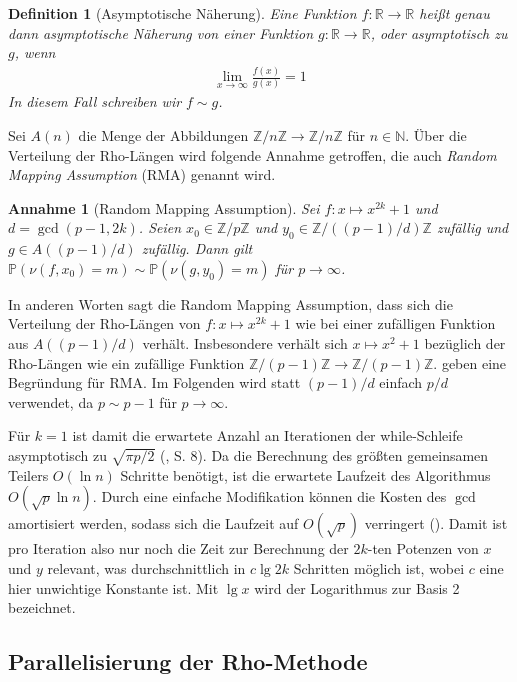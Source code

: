 \documentclass[a4paper, 10pt, ngerman]{article}
\newcommand{\N}{\mathbb{N}}
\newcommand{\R}{\mathbb{R}}
\newcommand{\Z}{\mathbb{Z}}
\renewcommand{\P}{\mathbb{P}}
\newtheorem{definition}{Definition}
\newtheorem*{assumption*}{Annahme}
\begin{document}
\begin{definition}[Asymptotische Näherung]
    Eine Funktion $f : \R \to \R$ heißt genau dann asymptotische Näherung von einer Funktion $g : \R \to \R$, oder asymptotisch zu $g$, wenn
    \begin{align*}
        \lim_{x \to \infty} \frac {f(x)} {g(x)} = 1
    \end{align*}
    In diesem Fall schreiben wir $f \sim g$.
\end{definition}

\noindent Sei $A(n)$ die Menge der Abbildungen $\Z/n\Z \to \Z/n\Z$ für $n \in \N$. Über die Verteilung der Rho-Längen wird folgende Annahme getroffen, die auch \emph{Random Mapping Assumption} (RMA) genannt wird.

\begin{assumption*}[Random Mapping Assumption]
    Sei $f : x \mapsto x^{2k} + 1$ und $d = \gcd(p - 1, 2k)$. Seien $x_0 \in \Z/p\Z$ und $y_0 \in \Z/((p - 1)/d)\Z$ zufällig und $g \in A((p - 1)/d)$ zufällig. Dann gilt $\P(\nu(f, x_0) = m) \sim \P(\nu(g, y_0) = m)$ für $p \to \infty$.
\end{assumption*}

\noindent In anderen Worten sagt die Random Mapping Assumption, dass sich die Verteilung der Rho-Längen von $f : x \mapsto x^{2k} + 1$ wie bei einer zufälligen Funktion aus $A((p - 1)/d)$ verhält. Insbesondere verhält sich $x \mapsto x^2 + 1$ bezüglich der Rho-Längen wie ein zufällige Funktion $\Z/(p - 1)\Z \to \Z/(p - 1)\Z$. \cite{bp81} geben eine Begründung für RMA. Im Folgenden wird statt $(p - 1)/d$ einfach $p/d$ verwendet, da $p \sim p - 1$ für $p \to \infty$.

Für $k = 1$ ist damit die erwartete Anzahl an Iterationen der while-Schleife asymptotisch zu $\sqrt{\pi p / 2}$ (\cite{knu98}, S. 8). Da die Berechnung des größten gemeinsamen Teilers $O(\ln n)$ Schritte benötigt, ist die erwartete Laufzeit des Algorithmus $O(\sqrt p \ln n)$. Durch eine einfache Modifikation können die Kosten des $\gcd$ amortisiert werden, sodass sich die Laufzeit auf $O(\sqrt p)$ verringert (\cite{bre80}). Damit ist pro Iteration also nur noch die Zeit zur Berechnung der $2k$-ten Potenzen von $x$ und $y$ relevant, was durchschnittlich in $c \lg 2k$ Schritten möglich ist, wobei $c$ eine hier unwichtige Konstante ist. Mit $\lg x$ wird der Logarithmus zur Basis 2 bezeichnet.

\subsection{Parallelisierung der Rho-Methode}
\end{document}
